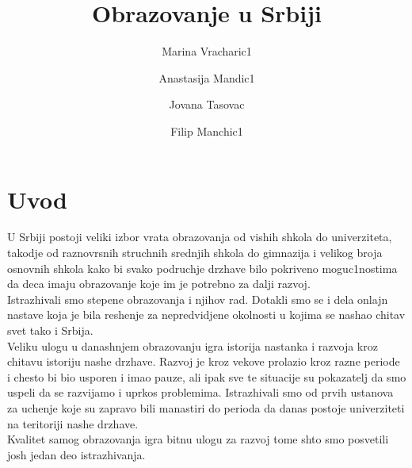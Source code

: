 \documentclass[12pt,twoside]{article}
\title{Obrazovanje u Srbiji}
\author{Marina Vracharic1\and Anastasija Mandic1\and Jovana Tasovac\and Filip Manchic1}
\newcommand{\cirilica}[1]{{\fontencoding{OT2}{\selectfont{#1}}}}
\begin{document}
\maketitle
    \renewcommand\contentsname{Sadrzhaj}
    \tableofcontents{}
    \thispagestyle{empty}
    \clearpage
    \thispagestyle{empty}
     \cleardoublepage
   
    
    
    
    
    
    \renewcommand\bibname{\cirilica{Literatura}}
    \nocite{*}
    
    
  \section{Uvod}
  U Srbiji postoji veliki izbor vrata obrazovanja od vishih shkola do univerziteta, takodje od raznovrsnih struchnih srednjih shkola do gimnazija i velikog broja osnovnih shkola kako bi svako podruchje drzhave bilo pokriveno moguc1nostima da deca imaju obrazovanje koje im je potrebno za dalji razvoj.
  \\ Istrazhivali smo stepene obrazovanja i njihov rad. Dotakli smo se i dela onlajn nastave koja je bila reshenje za nepredvidjene okolnosti u kojima se nashao chitav svet tako i Srbija.
  \\ Veliku ulogu u danashnjem obrazovanju igra istorija nastanka i razvoja kroz chitavu istoriju nashe drzhave. Razvoj je kroz vekove prolazio kroz razne periode i chesto bi bio usporen i imao pauze, ali ipak sve te situacije su pokazatelj da smo uspeli da se razvijamo i uprkos problemima. Istrazhivali smo od prvih ustanova za uchenje koje su zapravo bili manastiri do perioda da danas postoje univerziteti na teritoriji nashe drzhave.
  \\ Kvalitet samog obrazovanja igra bitnu ulogu za razvoj tome shto smo posvetili josh jedan deo istrazhivanja.
\end{document}
